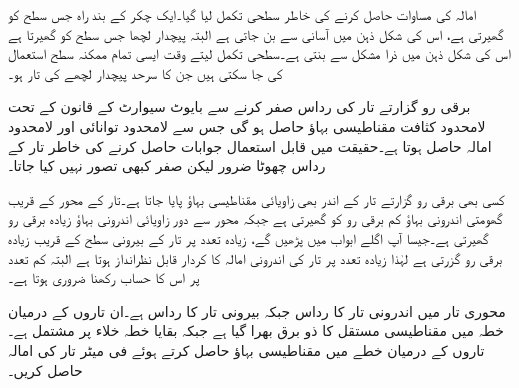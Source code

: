 امالہ کی مساوات حاصل کرنے کی خاطر سطحی تکمل لیا گیا۔ایک چکر کے بند راہ جس سطح کو گھیرتی ہے، اس کی شکل ذہن میں آسانی سے بن جاتی ہے البتہ پیچدار لچھا جس سطح کو گھیرتا ہے اس کی شکل ذہن میں ذرا مشکل سے بنتی ہے۔سطحی تکمل لیتے وقت ایسی تمام ممکنہ سطح استعمال کی جا سکتی ہیں جن کا سرحد پیچدار لچھے کی تار ہو۔

برقی رو گزارتے تار کی رداس صفر کرنے سے بایوٹ سیوارٹ کے قانون کے تحت لامحدود کثافت مقناطیسی بہاؤ حاصل ہو گی جس سے لامحدود توانائی اور لامحدود امالہ حاصل ہوتا ہے۔حقیقت میں قابل استعمال جوابات حاصل کرنے کی خاطر تار کے رداس  چھوٹا ضرور لیکن صفر کبھی تصور نہیں کیا جاتا۔

کسی بھی برقی رو گزارتے تار کے اندر بھی زاویائی مقناطیسی بہاؤ پایا جاتا ہے۔تار کے محور کے قریب  گھومتی اندرونی بہاؤ کم برقی رو کو گھیرتی ہے جبکہ محور سے دور زاویائی اندرونی بہاؤ زیادہ برقی رو گھیرتی ہے۔جیسا آپ اگلے ابواب میں پڑھیں گے، زیادہ تعدد پر تار کے بیرونی سطح کے قریب زیادہ برقی رو گزرتی ہے لہٰذا زیادہ تعدد پر تار کی اندرونی امالہ کا کردار قابل نظرانداز ہوتا ہے البتہ کم تعدد پر اس کا حساب رکھنا ضروری ہوتا ہے۔

محوری تار میں اندرونی تار کا رداس  جبکہ بیرونی تار کا رداس  ہے۔ان تاروں کے درمیان خطہ  میں  مقناطیسی مستقل کا ذو برق بھرا گیا ہے جبکہ بقایا خطہ خلاء پر مشتمل ہے۔تاروں کے درمیان خطے میں مقناطیسی بہاؤ حاصل کرتے ہوئے فی میٹر تار کی امالہ حاصل کریں۔

